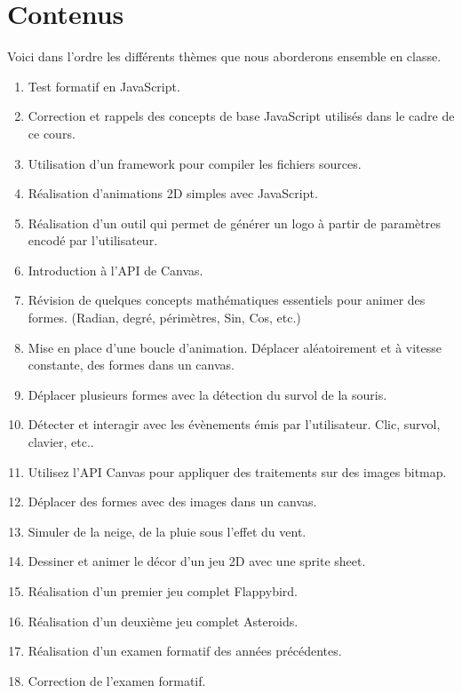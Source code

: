\section{Contenus}
\label{Contenus}
Voici dans l'ordre les différents thèmes que nous aborderons ensemble en classe.

\begin{enumerate}
    \item Test formatif en JavaScript.
    \item Correction et rappels des concepts de base JavaScript utilisés dans le cadre de ce cours.
    \item Utilisation d’un framework pour compiler les fichiers sources.
    \item Réalisation d'animations 2D simples avec JavaScript.
    \item Réalisation d’un outil qui permet de générer un logo à partir de paramètres encodé par l’utilisateur.
    \item Introduction à l’API de Canvas.
    \item Révision de quelques concepts mathématiques essentiels pour animer des formes. (Radian, degré, périmètres, Sin, Cos, etc.)
    \item Mise en place d’une boucle d’animation. Déplacer aléatoirement et à vitesse constante, des formes dans un canvas.
    \item Déplacer plusieurs formes avec la détection du survol de la souris.
    \item Détecter et interagir avec les évènements émis par l'utilisateur. Clic, survol, clavier, etc..
    \item Utilisez l’API Canvas pour appliquer des traitements sur des images bitmap.
    \item Déplacer des formes avec des images dans un canvas.
    \item Simuler de la neige, de la pluie sous l'effet du vent.
    \item Dessiner et animer le décor d’un jeu 2D avec une sprite sheet.
    \item Réalisation d’un premier jeu complet Flappybird.
    \item Réalisation d’un deuxième jeu complet Asteroids.
    \item Réalisation d’un examen formatif des années précédentes.
    \item Correction de l'examen formatif.
\end{enumerate}
